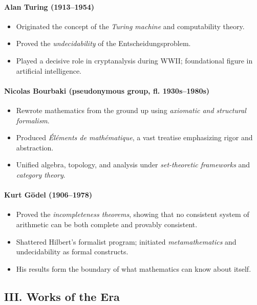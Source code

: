 \documentclass[9pt]{article}
\begin{document}
\paragraph{Alan Turing (1913--1954)}
\begin{itemize}
  \item Originated the concept of the \textit{Turing machine} and computability theory.
  \item Proved the \textit{undecidability} of the Entscheidungsproblem.
  \item Played a decisive role in cryptanalysis during WWII; foundational figure in artificial intelligence.
\end{itemize}

\paragraph{Nicolas Bourbaki (pseudonymous group, fl. 1930s--1980s)}
\begin{itemize}
  \item Rewrote mathematics from the ground up using \textit{axiomatic and structural formalism}.
  \item Produced \textit{Éléments de mathématique}, a vast treatise emphasizing rigor and abstraction.
  \item Unified algebra, topology, and analysis under \textit{set-theoretic frameworks} and \textit{category theory}.
\end{itemize}

\paragraph{Kurt Gödel (1906--1978)}
\begin{itemize}
  \item Proved the \textit{incompleteness theorems}, showing that no consistent system of arithmetic can be both complete and provably consistent.
  \item Shattered Hilbert’s formalist program; initiated \textit{metamathematics} and undecidability as formal constructs.
  \item His results form the boundary of what mathematics can know about itself.
\end{itemize}

\newpage

\subsection*{III. Works of the Era}
\end{document}
